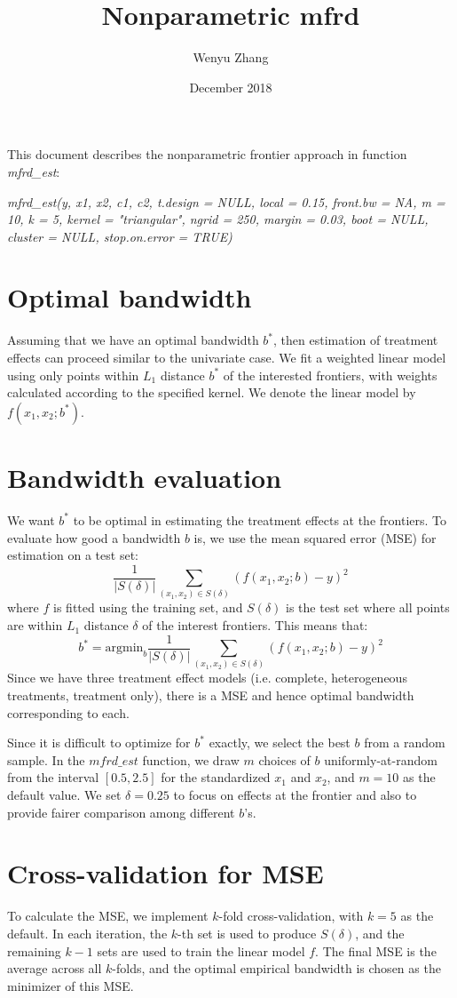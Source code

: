 \documentclass{article}
\title{Nonparametric mfrd}
\author{Wenyu Zhang}
\date{December 2018}
\begin{document}
\maketitle

This document describes the nonparametric frontier approach in function \textit{mfrd\_est}:

\textit{mfrd\_est(y, x1, x2, c1, c2, t.design = NULL, local = 0.15, front.bw = NA, m = 10, k = 5, kernel = "triangular",
ngrid = 250, margin = 0.03, boot = NULL, cluster = NULL, stop.on.error = TRUE)}

\section{Optimal bandwidth}

Assuming that we have an optimal bandwidth $b^*$, then estimation of treatment effects can proceed similar to the univariate case. We fit a weighted linear model using only points within $L_1$ distance $b^*$ of the interested frontiers, with weights calculated according to the specified kernel. We denote the linear model by $f(x_1, x_2; b^*)$.

\section{Bandwidth evaluation}

We want $b^*$ to be optimal in estimating the treatment effects at the frontiers. To evaluate how good a bandwidth $b$ is, we use the mean squared error (MSE) for estimation on a test set:
$$\frac{1}{|S(\delta)|} \sum_{(x_1,x_2) \in S(\delta)} \left( f(x_1,x_2; b) - y \right)^2$$
where $f$ is fitted using the training set, and $S(\delta)$ is the test set where all points are within $L_1$ distance $\delta$ of the interest frontiers. This means that: 
$$b^* = \text{argmin}_b \frac{1}{|S(\delta)|} \sum_{(x_1,x_2) \in S(\delta)} \left( f(x_1,x_2; b) - y \right)^2$$
Since we have three treatment effect models (i.e. complete, heterogeneous treatments, treatment only), there is a MSE and hence optimal bandwidth corresponding to each.

Since it is difficult to optimize for $b^*$ exactly, we select the best $b$ from a random sample. In the $mfrd\_est$ function, we draw $m$ choices of $b$ uniformly-at-random from the interval $[0.5,2.5]$ for the standardized $x_1$ and $x_2$, and $m = 10$ as the default value. We set $\delta = 0.25$ to focus on effects at the frontier and also to provide fairer comparison among different $b$'s.

\section{Cross-validation for MSE}

To calculate the MSE, we implement $k$-fold cross-validation, with $k = 5$ as the default. In each iteration, the $k$-th set is used to produce $S(\delta)$, and the remaining $k-1$ sets are used to train the linear model $f$. The final MSE is the average across all $k$-folds, and the optimal empirical bandwidth is chosen as the minimizer of this MSE.
\end{document}
